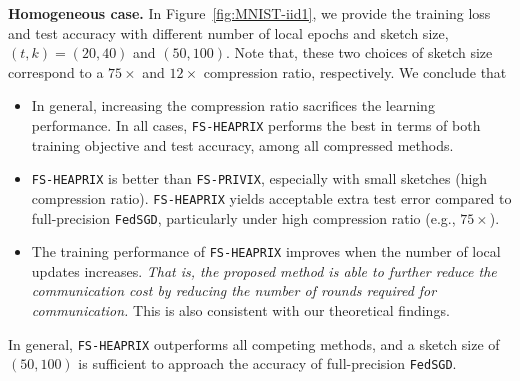 \documentclass[sigconf, anonymous, review]{acmart}
\begin{document}
\vspace{0.05in}
\noindent\textbf{Homogeneous case.} In Figure~\ref{fig:MNIST-iid1}, we provide the training loss and test accuracy with different number of local epochs and sketch size, $(t,k)=(20,40)$ and $(50,100)$. 
Note that, these two choices of sketch size correspond to a $75\times$ and $12\times$ compression ratio, respectively. We conclude that
\begin{itemize}
    \item In general, increasing the compression ratio sacrifices the learning performance. In all cases, \texttt{FS-HEAPRIX} performs the best in terms of both training objective and test accuracy, among all compressed methods.
    \vspace{0.05in}
    \item \texttt{FS-HEAPRIX} is better than \texttt{FS-PRIVIX}, especially with small sketches (high compression ratio). \texttt{FS-HEAPRIX} yields acceptable extra test error compared to full-precision \texttt{FedSGD}, particularly under high compression ratio (e.g., $75\times$). 
    \vspace{0.05in}
    \item The training performance of \texttt{FS-HEAPRIX} improves when the number of local updates increases. \emph{That is, the proposed method is able to further reduce the communication cost by reducing the number of rounds required for communication.} This is also consistent with our theoretical findings. 
\end{itemize}
In general, \texttt{FS-HEAPRIX} outperforms all competing methods, and a sketch size of $(50,100)$ is sufficient to approach the accuracy of full-precision \texttt{FedSGD}.
\end{document}
